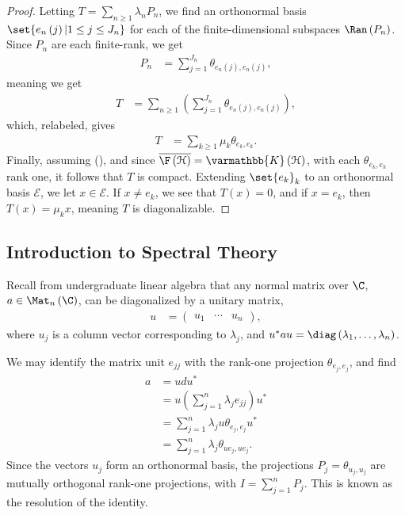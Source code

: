 \documentclass[10pt]{mypackage}
\renewcommand*{\mathbb}[1]{\varmathbb{#1}}
\newcommand{\K}{\mathbb{K}}
\begin{document}
\begin{proof}
  Letting $T = \sum_{n\geq 1}\lambda_nP_n$, we find an orthonormal basis $\set{e_n\left(j\right) | 1 \leq j \leq J_n}$ for each of the finite-dimensional subspaces $\Ran\left(P_n\right)$. Since $P_n$ are each finite-rank, we get
  \begin{align*}
    P_n &= \sum_{j=1}^{J_n}\theta_{e_n\left(j\right),e_n\left(j\right)},
  \end{align*}
  meaning we get
  \begin{align*}
    T &= \sum_{n\geq 1}\left(\sum_{j=1}^{J_n}\theta_{e_n\left(j\right),e_n\left(j\right)}\right),
  \end{align*}
  which, relabeled, gives
  \begin{align*}
    T &= \sum_{k\geq 1}\mu_k\theta_{e_k,e_k}.\tag*{(\textasteriskcentered)}
  \end{align*}
  Finally, assuming (\textasteriskcentered), and since $\overline{\F\left(\mathcal{H}\right)} = \K\left(\mathcal{H}\right)$, with each $\theta_{e_k,e_k}$ rank one, it follows that $T$ is compact. Extending $\set{e_k}_k$ to an orthonormal basis $\mathcal{E}$, we let $x\in \mathcal{E}$. If $x\neq e_k$, we see that $T\left(x\right) = 0$, and if $x = e_k$, then $T\left(x\right) = \mu_k x$, meaning $T$ is diagonalizable.
\end{proof}
\subsection{Introduction to Spectral Theory}%
Recall from undergraduate linear algebra that any normal matrix over $\C$, $a\in \Mat_{n}\left(\C\right)$, can be diagonalized by a unitary matrix,
\begin{align*}
  u &= \begin{pmatrix}u_1 & \cdots & u_n\end{pmatrix},
\end{align*}
where $u_j$ is a column vector corresponding to $\lambda_j$, and $u^{\ast}au = \diag\left(\lambda_1,\dots,\lambda_n\right)$.\newline

We may identify the matrix unit $e_{jj}$ with the rank-one projection $\theta_{e_j,e_j}$, and find
\begin{align*}
  a &= udu^{\ast}\\
    &= u\left(\sum_{j=1}^{n}\lambda_je_{jj}\right)u^{\ast}\\
    &= \sum_{j=1}^{n}\lambda_ju\theta_{e_j,e_j}u^{\ast}\\
    &= \sum_{j=1}^{n}\lambda_j\theta_{ue_j,ue_j}.
\end{align*}
Since the vectors $u_j$ form an orthonormal basis, the projections $P_j = \theta_{u_j,u_j}$ are mutually orthogonal rank-one projections, with $I = \sum_{j=1}^{n}P_j$. This is known as the resolution of the identity.\newline
\end{document}
